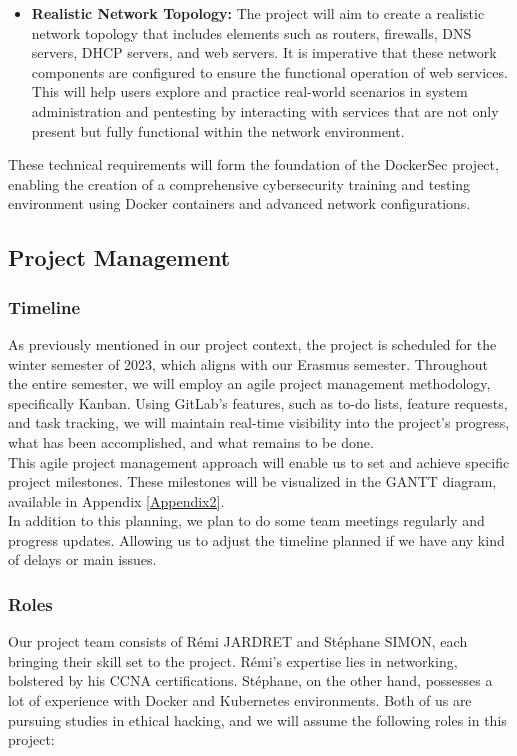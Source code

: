 \documentclass[a4paper,11pt,singlespacing]{article}
\begin{document}
\begin{itemize}
    \item \textbf{Realistic Network Topology:} The project will aim to create a realistic network topology that includes elements such as routers, firewalls, DNS servers, DHCP servers, and web servers. It is imperative that these network components are configured to ensure the functional operation of web services. This will help users explore and practice real-world scenarios in system administration and pentesting by interacting with services that are not only present but fully functional within the network environment.

 


\end{itemize}
These technical requirements will form the foundation of the DockerSec project, enabling the creation of a comprehensive cybersecurity training and testing environment using Docker containers and advanced network configurations.

\subsection{Project Management}
\subsubsection{Timeline}
As previously mentioned in our project context, the project is scheduled for the winter semester of 2023, which aligns with our Erasmus semester. Throughout the entire semester, we will employ an agile project management methodology, specifically Kanban. Using GitLab's features, such as to-do lists, feature requests, and task tracking, we will maintain real-time visibility into the project's progress, what has been accomplished, and what remains to be done.\\

This agile project management approach will enable us to set and achieve specific project milestones. These milestones will be visualized in the GANTT diagram, available in Appendix \ref{Appendix2}.\\

In addition to this planning, we plan to do some team meetings regularly and progress updates. Allowing us to adjust the timeline planned if we have any kind of delays or main issues.

\subsubsection{Roles}
Our project team consists of Rémi JARDRET and Stéphane SIMON, each bringing their skill set to the project. Rémi's expertise lies in networking, bolstered by his CCNA certifications. Stéphane, on the other hand, possesses a lot of experience with Docker and Kubernetes environments. Both of us are pursuing studies in ethical hacking, and we will assume the following roles in this project:
\end{document}

